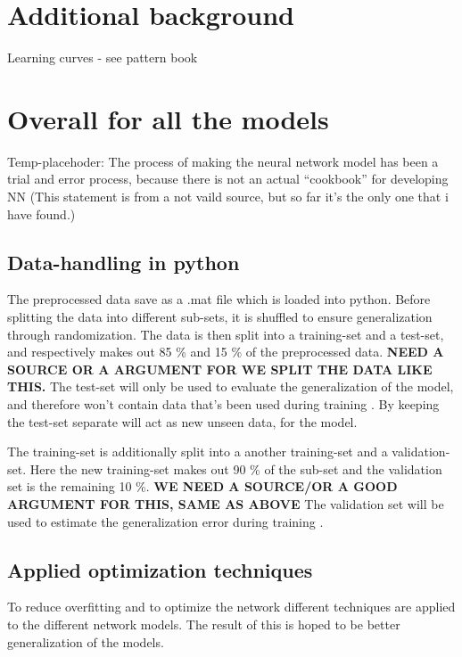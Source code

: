 \section{Additional background}
Learning curves - see pattern book


\section{Overall for all the models}
Temp-placehoder:
The process of making the neural network model has been a trial and error process, because there is not an actual “cookbook” for developing NN (This statement is from a not vaild source, but so far it’s the only one that i have found.)  

\subsection{Data-handling in python}
The preprocessed data save as a .mat file which is loaded into python. Before splitting the data into different sub-sets, it is shuffled to ensure generalization through randomization. The data is then split into a training-set and a test-set, and respectively makes out 85 \% and 15 \% of the preprocessed data. \textbf{NEED A SOURCE OR A ARGUMENT FOR WE SPLIT THE DATA LIKE THIS.} The test-set will only be used to evaluate the generalization of the model, and therefore won't contain data that's been used during training \citep{Duda2000}. 
By keeping the test-set separate will act as new unseen data, for the model.  

The training-set is additionally split into a another training-set and a validation-set. Here the new training-set makes out 90 \% of the sub-set and the validation set is the remaining 10 \%. \textbf{WE NEED A SOURCE/OR A GOOD ARGUMENT FOR THIS, SAME AS ABOVE} 
The validation set will be used to estimate the generalization error during training \citep{Duda2000}.  

\subsection{Applied optimization techniques}
To reduce overfitting and to optimize the network different techniques are applied to the different network models. The result of this is hoped to be better generalization of the models. 

